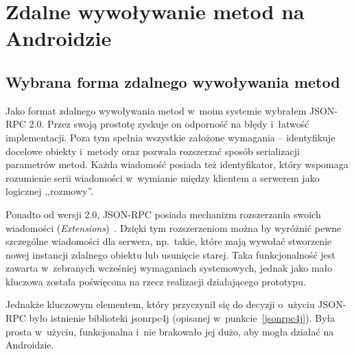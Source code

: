 



\section{Zdalne wywoływanie metod na Androidzie}
\label{android-rpc}

\subsection{Wybrana forma zdalnego wywoływania metod}
Jako format zdalnego wywoływania metod w~moim systemie wybrałem JSON-RPC 2.0. Przez swoją prostotę zyskuje on odporność na błędy i~łatwość implementacji.
Poza tym spełnia wszystkie założone wymagania -- identyfikuje docelowe obiekty i~metody oraz pozwala rozszerzać sposób serializacji parametrów metod.
Każda wiadomość posiada też identyfikator, który wspomaga rozumienie serii wiadomości w~wymianie między klientem a serwerem jako logicznej ,,rozmowy''.

Ponadto od wersji 2.0, JSON-RPC posiada mechanizm rozszerzania swoich wiadomości (\emph{Extensions})~\cite{json-rpc-extensions}.
Dzięki tym rozszerzeniom można by wyróżnić pewne szczególne wiadomości dla serwera, np.\ takie, które mają wywołać stworzenie nowej instancji zdalnego obiektu lub usunięcie starej.
Taka funkcjonalność jest zawarta w~zebranych wcześniej wymaganiach systemowych, jednak jako mało kluczowa została poświęcona na rzecz realizacji działającego prototypu.

Jednakże kluczowym elementem, który przyczynił się do decyzji o~użyciu JSON-RPC było istnienie biblioteki jsonrpc4j (opisanej w~punkcie~\ref{jsonrpc4j}). Była prosta w~użyciu, funkcjonalna i~nie brakowało jej dużo, aby mogła działać na Androidzie.


